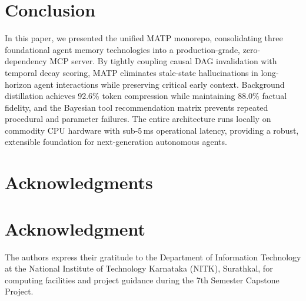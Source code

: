 \documentclass[10pt,journal,compsoc]{IEEEtran}
\begin{document}
\section{Conclusion}
\label{sec:conclusion}

In this paper, we presented the unified MATP monorepo, consolidating three foundational agent memory technologies into a production-grade, zero-dependency MCP server. By tightly coupling causal DAG invalidation with temporal decay scoring, MATP eliminates stale-state hallucinations in long-horizon agent interactions while preserving critical early context. Background distillation achieves 92.6\% token compression while maintaining 88.0\% factual fidelity, and the Bayesian tool recommendation matrix prevents repeated procedural and parameter failures. The entire architecture runs locally on commodity CPU hardware with sub-5\,ms operational latency, providing a robust, extensible foundation for next-generation autonomous agents.

\ifCLASSOPTIONcompsoc
  \section*{Acknowledgments}
\else
  \section*{Acknowledgment}
\fi
The authors express their gratitude to the Department of Information Technology at the National Institute of Technology Karnataka (NITK), Surathkal, for computing facilities and project guidance during the 7th Semester Capstone Project.
\end{document}
